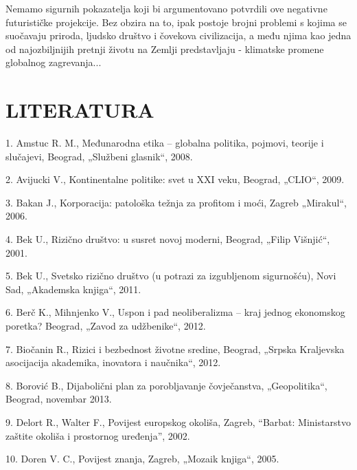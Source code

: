 \documentclass[a4paper]{article}
\begin{document}
Nemamo sigurnih pokazatelja koji bi argumentovano potvrdili ove negativne futurističke projekcije. Bez obzira na to, ipak postoje brojni problemi s kojima se suočavaju priroda, ljudsko društvo i čovekova civilizacija, a među njima kao jedna od najozbiljnijih pretnji životu na Zemlji predstavljaju - klimatske promene globalnog zagrevanja...

\section{LITERATURA}
\label{sec:literatura}
1. Amstuc R. M., Međunarodna etika – globalna politika, pojmovi, teorije i slučajevi, Beograd, „Službeni glasnik“, 2008.

2. Avijucki V., Kontinentalne politike: svet u XXI veku, Beograd, „CLIO“, 2009.

3. Bakan J., Korporacija: patološka težnja za profitom i moći, Zagreb „Mirakul“, 2006.

4. Bek U., Rizično društvo: u susret novoj moderni, Beograd, „Filip Višnjić“, 2001.

5. Bek U., Svetsko rizično društvo (u potrazi za izgubljenom sigurnošću), Novi Sad, „Akademska knjiga“, 2011.

6. Berč K., Mihnjenko V., Uspon i pad neoliberalizma – kraj jednog ekonomskog poretka? Beograd, „Zavod za udžbenike“, 2012.

7. Biočanin R., Rizici i bezbednost životne sredine, Beograd, „Srpska Kraljevska asocijacija akademika, inovatora i naučnika“, 2012.

8. Borović B., Dijabolični plan za porobljavanje čovječanstva, „Geopolitika“, Beograd, novembar 2013.

9. Delort R., Walter F., Povijest europskog okoliša, Zagreb, “Barbat: Ministarstvo zaštite okoliša i prostornog uređenja”, 2002.

10. Doren V. C., Povijest znanja, Zagreb, „Mozaik knjiga“, 2005.
\end{document}
